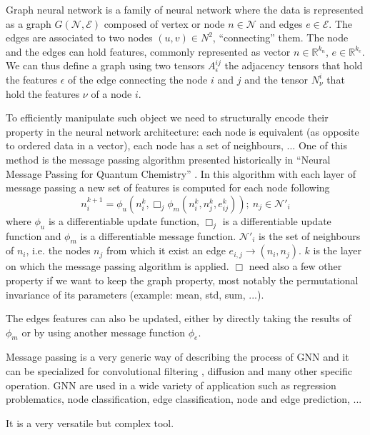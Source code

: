 Graph neural network is a family of neural network where the data is represented as a graph $G(\mathcal{N},\mathcal{E})$ composed of vertex or node $n \in \mathcal{N}$ and edges $e \in \mathcal{E}$. The edges are associated to two nodes $(u, v) \in N^2$, ``connecting'' them. The node and the edges can hold features, commonly represented as vector $n \in \mathbb{R}^{k_{n}}$, $e \in \mathbb{R}^{k_{e}}$. We can thus define a graph using two tensors $A^{ij}_{\epsilon}$ the adjacency tensors that hold the features $\epsilon$ of the edge connecting the node $i$ and $j$ and the tensor $N^{i}_{\nu}$ that hold the features $\nu$ of a node $i$.

To efficiently manipulate such object we need to structurally encode their property in the neural network architecture: each node is equivalent (as opposite to ordered data in a vector), each node has a set of neighbours, ... One of this method is the message passing algorithm presented historically in ``Neural Message Passing for Quantum Chemistry'' \cite{gilmer_neural_2017}. In this algorithm with each layer of message passing a new set of features is computed for each node following
\begin{equation}
  n_i^{k+1} = \phi_u (n_i^k, \Box_j \phi_m(n_i^k, n_j^k, e^k_{ij})); ~ n_j \in \mathcal{N}'_i
\end{equation}
where $\phi_u$ is a differentiable update function, $\Box_j$ is a differentiable update function and $\phi_m$ is a differentiable message function. $\mathcal{N}'_i$ is the set of neighbours of $n_i$, i.e. the nodes $n_j$ from which it exist an edge $e_{i,j} \rightarrow (n_i, n_j)$. $k$ is the layer on which the message passing algorithm is applied. $\Box$ need also a few other property if we want to keep the graph property, most notably the permutational invariance of its parameters (example: mean, std, sum, ...).

The edges features can also be updated, either by directly taking the results of $\phi_m$ or by using another message function $\phi_e$.


Message passing is a very generic way of describing the process of GNN and it can be specialized for convolutional filtering \cite{defferrard_convolutional_2017}, diffusion \cite{li_diffusion_2018} and many other specific operation. GNN are used in a wide variety of application such as regression problematics, node classification, edge classification, node and edge prediction, ...


It is a very versatile but complex tool.

